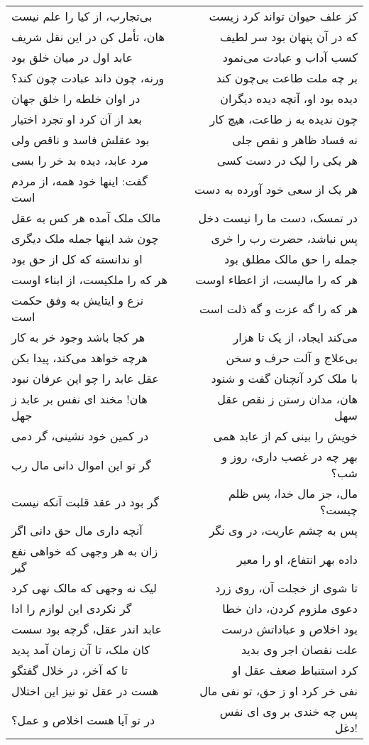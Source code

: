 \begin{center}
\begin{longtable}{l p{0.5cm} r}
\\
بی‌تجارب، از کیا را علم نیست
&&
کز علف حیوان تواند کرد زیست
\\
هان، تأمل کن در این نقل شریف
&&
که در آن پنهان بود سر لطیف
\\
عابد اول در میان خلق بود
&&
کسب آداب و عبادت می‌نمود
\\
ورنه، چون داند عبادت چون کند؟
&&
بر چه ملت طاعت بی‌چون کند
\\
در اوان خلطه را خلق جهان
&&
دیده بود او، آنچه دیده دیگران
\\
بعد از آن کرد او تجرد اختیار
&&
چون ندیده به ز طاعت، هیچ کار
\\
بود عقلش فاسد و ناقص ولی
&&
نه فساد ظاهر و نقص جلی
\\
مرد عابد، دیده بد خر را بسی
&&
هر یکی را لیک در دست کسی
\\
گفت: اینها خود همه، از مردم است
&&
هر یک از سعی خود آورده به دست
\\
مالک ملک آمده هر کس به عقل
&&
در تمسک، دست ما را نیست دخل
\\
چون شد اینها جمله ملک دیگری
&&
پس نباشد، حضرت رب را خری
\\
او ندانسته که کل از حق بود
&&
جمله را حق مالک مطلق بود
\\
هر که را ملکیست، از ابناء اوست
&&
هر که را مالیست، از اعطاء اوست
\\
نزع و ایتایش به وفق حکمت است
&&
هر که را گه عزت و گه ذلت است
\\
هر کجا باشد وجود خر به کار
&&
می‌کند ایجاد، از یک تا هزار
\\
هرچه خواهد می‌کند، پیدا بکن
&&
بی‌علاج و آلت حرف و سخن
\\
عقل عابد را چو این عرفان نبود
&&
با ملک کرد آنچنان گفت و شنود
\\
هان! مخند ای نفس بر عابد ز جهل
&&
هان، مدان رستن ز نقص عقل سهل
\\
در کمین خود نشینی، گر دمی
&&
خویش را بینی کم از عابد همی
\\
گر تو این اموال دانی مال رب
&&
بهر چه در غصب داری، روز و شب؟
\\
گر بود در عقد قلبت آنکه نیست
&&
مال، جز مال خدا، پس ظلم چیست؟
\\
آنچه داری مال حق دانی اگر
&&
پس به چشم عاریت، در وی نگر
\\
زان به هر وجهی که خواهی نفع گیر
&&
داده بهر انتفاع، او را معیر
\\
لیک نه وجهی که مالک نهی کرد
&&
تا شوی از خجلت آن، روی زرد
\\
گر نکردی این لوازم را ادا
&&
دعوی ملزوم کردن، دان خطا
\\
عابد اندر عقل، گرچه بود سست
&&
بود اخلاص و عباداتش درست
\\
کان ملک، تا آن زمان آمد پدید
&&
علت نقصان اجر وی بدید
\\
تا که آخر، در خلال گفتگو
&&
کرد استنباط ضعف عقل او
\\
هست در عقل تو نیز این اختلال
&&
نفی خر کرد او ز حق، تو نفی مال
\\
در تو آیا هست اخلاص و عمل؟
&&
پس چه خندی بر وی ای نفس دغل!
\\
\end{longtable}
\end{center}
